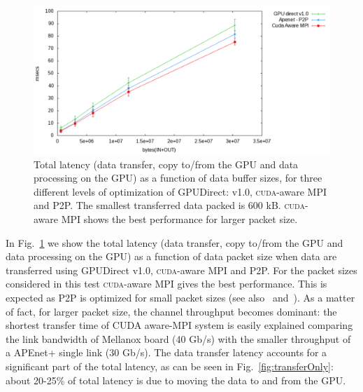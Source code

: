 \documentclass[journal]{IEEEtran}
\begin{document}
\begin{figure}[!t]
  \centering
  \includegraphics[width=0.85\linewidth]{figures/datatransfer}
  \caption{Total latency (data transfer, copy to/from the GPU and data
    processing on the GPU) as a function of data buffer sizes, for
    three different levels of optimization of GPUDirect: v1.0,
    \textsc{cuda}-aware MPI and P2P. The smallest transferred data
    packed is 600 kB.  \textsc{cuda}-aware MPI shows the best
    performance for larger packet size.}
  \label{fig:xferlatency}
\end{figure}

In Fig.~\ref{fig:xferlatency} we show the total latency (data
transfer, copy to/from the GPU and data processing on the GPU) as a
function of data packet size when data are transferred using GPUDirect
v1.0, \textsc{cuda}-aware MPI and P2P. For the packet sizes considered in this test 
 \textsc{cuda}-aware MPI gives the best performance. This is expected as 
P2P is optimized for small packet sizes
 (see also~\cite{NSS2012} and~\cite{bib_mvapich}). As a matter of fact, for larger packet size, the channel 
throughput becomes dominant: the shortest transfer 
time of CUDA aware-MPI system is easily explained comparing the link bandwidth of Mellanox board (40 Gb/s) 
with the smaller throughput of a APEnet+ single link (30 Gb/s).  
The data transfer latency accounts for a significant part of the total
latency, as can be seen in Fig.~\ref{fig:transferOnly}: about 20-25\%
of total latency is due to moving the data to and from the GPU.

\end{document}
